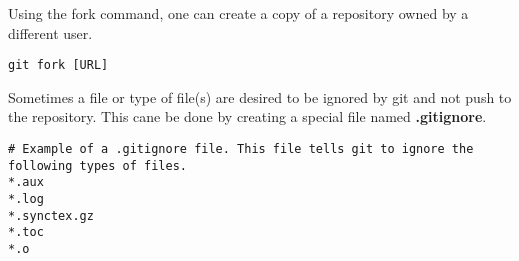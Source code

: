 Using the fork command, one can create a copy of a repository owned by a different user.
\begin{lstlisting}
git fork [URL]
\end{lstlisting}

Sometimes a file or type of file(s) are desired to be ignored by git and not push to the repository. This cane be done by creating a special file named \textbf{.gitignore}.
\begin{lstlisting}
# Example of a .gitignore file. This file tells git to ignore the following types of files.
*.aux
*.log
*.synctex.gz
*.toc
*.o
\end{lstlisting}

